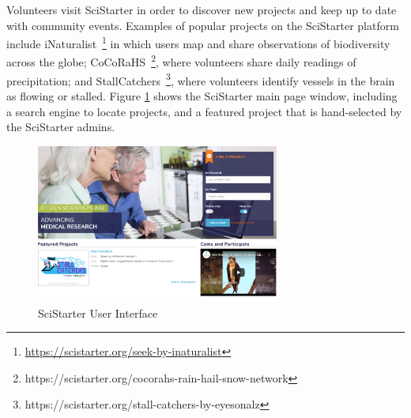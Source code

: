\documentclass[letterpaper]{article} %
\begin{document}
      Volunteers visit SciStarter in order to discover new projects and keep up to date with   community events.
       Examples of popular projects on the SciStarter platform include iNaturalist~\footnote{\url{https://scistarter.org/seek-by-inaturalist}} in which users map and share observations of biodiversity across the globe; CoCoRaHS~\footnote{https://scistarter.org/cocorahs-rain-hail-snow-network}, where volunteers share daily readings of precipitation; and StallCatchers~\footnote{https://scistarter.org/stall-catchers-by-eyesonalz}, where volunteers identify vessels in the brain as flowing or stalled.
      Figure \ref{fig:ui} shows the  SciStarter main page window, including a search engine to locate projects, and a featured project that is hand-selected
      by the SciStarter admins.




\begin{figure}[t]
\centering
\includegraphics[width=8cm]{Figs/SciStarterUI.PNG}
\caption{SciStarter User Interface}
\label{fig:ui}
\end{figure}
\end{document}

